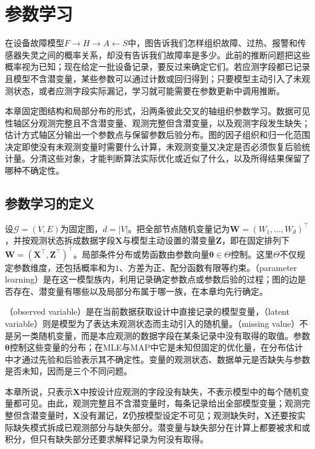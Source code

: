 \chapter{参数学习}
\label{chap:pgm-parameter-learning}

在设备故障模型$F\to H\to A\leftarrow S$中，图告诉我们怎样组织故障、过热、报警和传感器失灵之间的概率关系，却没有告诉我们故障率是多少。此前的推断问题把这些概率视为已知；现在给定一批设备记录，要反过来确定它们。若应测字段都已记录且模型不含潜变量，某些参数可以通过计数或回归得到；只要模型主动引入了未观测状态，或者应测字段实际漏记，学习就可能需要在参数更新中调用推断。

本章固定图结构和局部分布的形式，沿两条彼此交叉的轴组织参数学习。数据可见性轴区分观测完整且不含潜变量、观测完整但含潜变量，以及观测字段发生缺失；估计方式轴区分输出一个参数点与保留参数后验分布。图的因子组织和归一化范围决定即使没有未观测变量时需要什么计算，未观测变量又决定是否必须恢复后验统计量。分清这些对象，才能判断算法实际优化或近似了什么，以及所得结果保留了哪种不确定性。

\section{参数学习的定义}
\label{sec:pgm-parameter-learning-definition}

设$\mathcal{G}=(V,E)$为固定图，$d=|V|$。把全部节点随机变量记为$\bm{W}=(W_1,\ldots,W_d)^\top$，并按观测状态拆成数据字段$\bm{X}$与模型主动设置的潜变量$\bm{Z}$，即在固定排列下$\bm{W}=(\bm{X}^\top,\bm{Z}^\top)^\top$。局部条件分布或势函数由参数向量$\bm{\theta}\in\Theta$控制。这里$\Theta$不仅规定参数维度，还包括概率和为$1$、方差为正、配分函数有限等约束。（parameter learning）是在这一模型族内，利用记录确定参数点或参数后验的过程；图的边是否存在、潜变量有哪些以及局部分布属于哪一族，在本章均先行确定。

（observed variable）是在当前数据获取设计中直接记录的模型变量，（latent variable）则是模型为了表达未观测状态而主动引入的随机量。（missing value）不是另一类随机变量，而是本应观测的数据字段在某条记录中没有取得的取值。参数$\bm{\theta}$控制这些变量的分布；在MLE与MAP中它是未知但固定的优化量，在分布估计中才通过先验和后验表示其不确定性。变量的观测状态、数据单元是否缺失与参数是否未知，因而是三个不同问题。

本章所说，只表示$\bm{X}$中按设计应观测的字段没有缺失，不表示模型中的每个随机变量都可见。由此，观测完整且不含潜变量时，每条记录给出全部模型变量；观测完整但含潜变量时，$\bm{X}$没有漏记，$\bm{Z}$仍按模型设定不可见；观测缺失时，$\bm{X}$还要按实际缺失模式拆成已观测部分与缺失部分。潜变量与缺失部分在计算上都要被求和或积分，但只有缺失部分还要求解释记录为何没有取得。

